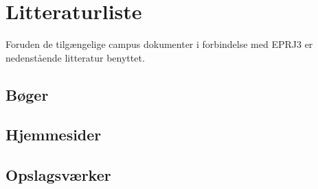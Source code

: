 \chapter{Litteraturliste}
Foruden de tilgængelige campus dokumenter i forbindelse med EPRJ3 er nedenstående litteratur benyttet. 

\section{Bøger}



\section{Hjemmesider}



\section{Opslagsværker}
